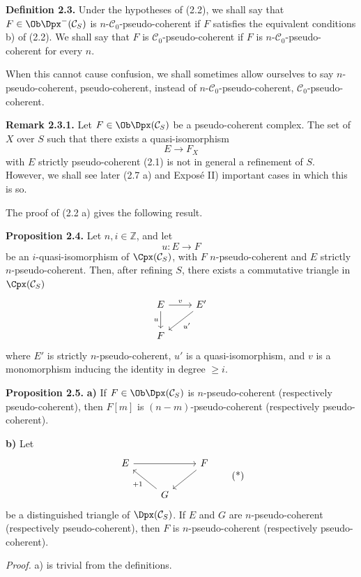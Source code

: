 \documentclass[11pt]{article}
\begin{document}
\textbf{Definition 2.3.} Under the hypotheses of (2.2), we shall say that \(F\in\Ob\Dpx^-(\mathcal C_S)\) is \(n\)-\(\mathcal C_0\)-pseudo-coherent if \(F\) satisfies the equivalent conditions b) of (2.2). We shall say that \(F\) is \(\mathcal C_0\)-pseudo-coherent if \(F\) is \(n\)-\(\mathcal C_0\)-pseudo-coherent for every \(n\).

When this cannot cause confusion, we shall sometimes allow ourselves to say \(n\)-pseudo-coherent, pseudo-coherent, instead of \(n\)-\(\mathcal C_0\)-pseudo-coherent, \(\mathcal C_0\)-pseudo-coherent.

\textbf{Remark 2.3.1.} Let \(F\in\Ob\Dpx(\mathcal C_S)\) be a pseudo-coherent complex. The set of \(X\) over \(S\) such that there exists a quasi-isomorphism
\[
  E\longrightarrow F_X
\]
with \(E\) strictly pseudo-coherent (2.1) is not in general a refinement of \(S\). However, we shall see later (2.7 a) and Exposé II) important cases in which this is so.

The proof of (2.2 a) gives the following result.

\textbf{Proposition 2.4.} Let \(n,i\in\mathbb Z\), and let
\[
  u:E\longrightarrow F
\]
be an \(i\)-quasi-isomorphism of \(\Cpx(\mathcal C_S)\), with \(F\) \(n\)-pseudo-coherent and \(E\) strictly \(n\)-pseudo-coherent. Then, after refining \(S\), there exists a commutative triangle in \(\Cpx(\mathcal C_S)\)
\[
\begin{tikzcd}
E \arrow[r,"v"] \arrow[d,"u"'] & E' \arrow[dl,"u'"]\\
F &
\end{tikzcd}
\]
where \(E'\) is strictly \(n\)-pseudo-coherent, \(u'\) is a quasi-isomorphism, and \(v\) is a monomorphism inducing the identity in degree \(\geq i\).

\textbf{Proposition 2.5.} \textbf{a)} If \(F\in\Ob\Dpx(\mathcal C_S)\) is \(n\)-pseudo-coherent (respectively pseudo-coherent), then \(F[m]\) is \((n-m)\)-pseudo-coherent (respectively pseudo-coherent).

\textbf{b)} Let
\[
\begin{tikzcd}
E \arrow[rr] && F \arrow[dl]\\
& G \arrow[ul,"+1"] &
\end{tikzcd}
\tag{*}
\]
be a distinguished triangle of \(\Dpx(\mathcal C_S)\). If \(E\) and \(G\) are \(n\)-pseudo-coherent (respectively pseudo-coherent), then \(F\) is \(n\)-pseudo-coherent (respectively pseudo-coherent).

\emph{Proof.} a) is trivial from the definitions.
\end{document}
